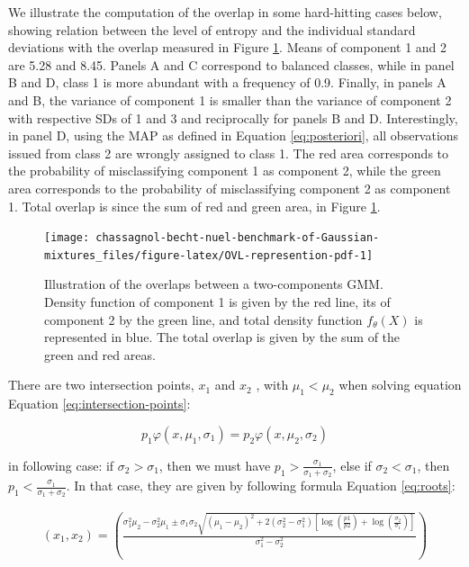 We illustrate the computation of the overlap in some hard-hitting cases
below, showing relation between the level of entropy and the individual
standard deviations with the overlap measured in Figure
\ref{fig:OVL-represention-pdf}.
Means of component 1 and 2 are 5.28 and 8.45. Panels A and C correspond
to balanced classes, while in panel B and D, class 1 is more abundant
with a frequency of 0.9. Finally, in panels A and B, the variance of
component 1 is smaller than the variance of component 2 with respective
SDs of 1 and 3 and reciprocally for panels B and D. Interestingly, in
panel D, using the MAP as defined in Equation \eqref{eq:posteriori}, all
observations issued from class 2 are wrongly assigned to class 1. The
red area corresponds to the probability of misclassifying component 1 as
component 2, while the green area corresponds to the probability of
misclassifying component 2 as component 1. Total overlap is since the
sum of red and green area, in Figure
\ref{fig:OVL-represention-pdf}.

\begin{figure}

{\centering \texttt{[image: chassagnol-becht-nuel-benchmark-of-Gaussian-mixtures\_files/figure-latex/OVL-represention-pdf-1]} 

}

\caption{Illustration of the overlaps between a two-components GMM. Density function of component 1 is given by the red line, its of component 2 by the green line, and total density function $f_\theta(X)$ is represented in blue. The total overlap is given by the sum of the green and red areas.}\label{fig:OVL-represention-pdf}
\end{figure}

There are two intersection points, \(x_1\) and \(x_2\) , with
\(\mu_1 < \mu_2\) when solving equation Equation
\eqref{eq:intersection-points}:

\begin{equation}
p_1 \varphi(x, \mu_1, \sigma_1)  = p_2 \varphi(x, \mu_2, \sigma_2)
\label{eq:intersection-points}
\end{equation}

in following case: if \(\sigma_2 > \sigma_1\), then we must have
\(p_1 > \frac{\sigma_1}{\sigma_1 + \sigma_2}\), else if
\(\sigma_2 < \sigma_1\), then
\(p_1 < \frac{\sigma_1}{\sigma_1 + \sigma_2}\). In that case, they are
given by following formula Equation \eqref{eq:roots}:

\begin{equation}
\begin{split}
(x_1, x_2) = \left(\frac{\sigma_1^2 \mu_2 - \sigma_2^2 \mu_1 \pm \sigma_1 \sigma_2 \sqrt{(\mu_1 - \mu_2)^2 + 2(\sigma_2^2 - \sigma_1^2)\left[ \log (\frac{p1}{p2}) + \log (\frac{\sigma_2}{\sigma_1})\right]}}{\sigma_1^2 - \sigma_2^2}\right)
\end{split}
\label{eq:roots}
\end{equation}

